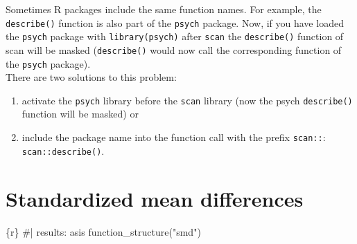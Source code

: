 \documentclass[
  letterpaper,
  DIV=11,
  numbers=noendperiod]{scrreprt}
\newenvironment{Shaded}{\begin{snugshade}}{\end{snugshade}}
\newcommand{\CommentTok}[1]{\textcolor[rgb]{0.37,0.37,0.37}{#1}}
\newcommand{\FunctionTok}[1]{\textcolor[rgb]{0.28,0.35,0.67}{#1}}
\newcommand{\InformationTok}[1]{\textcolor[rgb]{0.37,0.37,0.37}{#1}}
\newcommand{\NormalTok}[1]{\textcolor[rgb]{0.00,0.23,0.31}{#1}}
\newcommand{\StringTok}[1]{\textcolor[rgb]{0.13,0.47,0.30}{#1}}
\providecommand{\tightlist}{%
  \setlength{\itemsep}{0pt}\setlength{\parskip}{0pt}}\usepackage{longtable,booktabs,array}
\begin{document}
\begin{tcolorbox}[enhanced jigsaw, breakable, toptitle=1mm, colframe=quarto-callout-note-color-frame, arc=.35mm, titlerule=0mm, coltitle=black, rightrule=.15mm, bottomtitle=1mm, bottomrule=.15mm, colbacktitle=quarto-callout-note-color!10!white, title=\textcolor{quarto-callout-note-color}{\faInfo}\hspace{0.5em}{Conflicting function names}, colback=white, opacitybacktitle=0.6, opacityback=0, leftrule=.75mm, toprule=.15mm, left=2mm]

Sometimes R packages include the same function names. For example, the
\texttt{describe()} function is also part of the \texttt{psych} package.
Now, if you have loaded the \texttt{psych} package with
\texttt{library(psych)} after \texttt{scan} the \texttt{describe()}
function of scan will be masked (\texttt{describe()} would now call the
corresponding function of the \texttt{psych} package).\\
There are two solutions to this problem:

\begin{enumerate}
\def\labelenumi{\arabic{enumi}.}
\tightlist
\item
  activate the \texttt{psych} library before the \texttt{scan} library
  (now the psych \texttt{describe()} function will be masked) or
\item
  include the package name into the function call with the prefix
  \texttt{scan::}: \texttt{scan::describe()}.
\end{enumerate}

\end{tcolorbox}

\hypertarget{standardized-mean-differences}{%
\section{Standardized mean
differences}\label{standardized-mean-differences}}

\begin{Shaded}
\begin{Highlighting}[]
\InformationTok{\textasciigrave{}\textasciigrave{}\textasciigrave{}\{r\}}
\CommentTok{\#| results: asis}
\FunctionTok{function\_structure}\NormalTok{(}\StringTok{"smd"}\NormalTok{)}
\InformationTok{\textasciigrave{}\textasciigrave{}\textasciigrave{}}
\end{Highlighting}
\end{Shaded}
\end{document}
